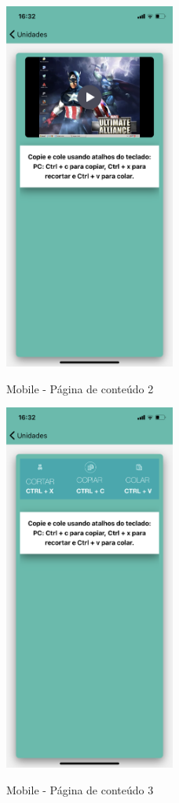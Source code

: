 \begin{figure}[H]
    \centering
    \caption{Mobile - Página de conteúdo 2 }
    \includegraphics[width=0.5\textwidth]{figuras/Mobile - pagina de conteudo2.png}
    \label{fig:wireframe_mobile_tela_de_conteudo2}
    {}
\end{figure}

\begin{figure}[H]
    \centering
    \caption{Mobile - Página de conteúdo 3}
    \includegraphics[width=0.5\textwidth]{figuras/Mobile - pagina de conteudo3.png}
    \label{fig:wireframe_mobile_tela_de_conteudo3}
    {}
\end{figure}